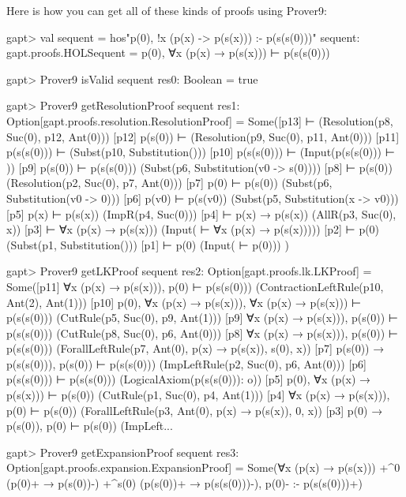 \documentclass[a4paper,11pt]{book}
\begin{document}
Here is how you can get all of these kinds of proofs using Prover9:
\begin{clilisting}
gapt> val sequent = hos"p(0), !x (p(x) -> p(s(x))) :- p(s(s(0)))"
sequent: gapt.proofs.HOLSequent = p(0), ∀x (p(x) → p(s(x))) ⊢ p(s(s(0)))

\end{clilisting}

\begin{clilisting}
gapt> Prover9 isValid sequent
res0: Boolean = true

gapt> Prover9 getResolutionProof sequent
res1: Option[gapt.proofs.resolution.ResolutionProof] =
Some([p13]  ⊢    (Resolution(p8, Suc(0), p12, Ant(0)))
[p12] p(s(0)) ⊢    (Resolution(p9, Suc(0), p11, Ant(0)))
[p11] p(s(s(0))) ⊢    (Subst(p10, Substitution()))
[p10] p(s(s(0))) ⊢    (Input(p(s(s(0))) ⊢ ))
[p9] p(s(0)) ⊢ p(s(s(0)))   (Subst(p6, Substitution(v0 -> s(0))))
[p8]  ⊢ p(s(0))   (Resolution(p2, Suc(0), p7, Ant(0)))
[p7] p(0) ⊢ p(s(0))   (Subst(p6, Substitution(v0 -> 0)))
[p6] p(v0) ⊢ p(s(v0))   (Subst(p5, Substitution(x -> v0)))
[p5] p(x) ⊢ p(s(x))   (ImpR(p4, Suc(0)))
[p4]  ⊢ p(x) → p(s(x))   (AllR(p3, Suc(0), x))
[p3]  ⊢ ∀x (p(x) → p(s(x)))   (Input( ⊢ ∀x (p(x) → p(s(x)))))
[p2]  ⊢ p(0)   (Subst(p1, Substitution()))
[p1]  ⊢ p(0)   (Input( ⊢ p(0)))
)

gapt> Prover9 getLKProof sequent
res2: Option[gapt.proofs.lk.LKProof] =
Some([p11] ∀x (p(x) → p(s(x))), p(0) ⊢ p(s(s(0)))    (ContractionLeftRule(p10, Ant(2), Ant(1)))
[p10] p(0), ∀x (p(x) → p(s(x))), ∀x (p(x) → p(s(x))) ⊢ p(s(s(0)))    (CutRule(p5, Suc(0), p9, Ant(1)))
[p9] ∀x (p(x) → p(s(x))), p(s(0)) ⊢ p(s(s(0)))    (CutRule(p8, Suc(0), p6, Ant(0)))
[p8] ∀x (p(x) → p(s(x))), p(s(0)) ⊢ p(s(s(0)))    (ForallLeftRule(p7, Ant(0), p(x) → p(s(x)), s(0), x))
[p7] p(s(0)) → p(s(s(0))), p(s(0)) ⊢ p(s(s(0)))    (ImpLeftRule(p2, Suc(0), p6, Ant(0)))
[p6] p(s(s(0))) ⊢ p(s(s(0)))    (LogicalAxiom(p(s(s(0))): o))
[p5] p(0), ∀x (p(x) → p(s(x))) ⊢ p(s(0))    (CutRule(p1, Suc(0), p4, Ant(1)))
[p4] ∀x (p(x) → p(s(x))), p(0) ⊢ p(s(0))    (ForallLeftRule(p3, Ant(0), p(x) → p(s(x)), 0, x))
[p3] p(0) → p(s(0)), p(0) ⊢ p(s(0))    (ImpLeft...

gapt> Prover9 getExpansionProof sequent
res3: Option[gapt.proofs.expansion.ExpansionProof] =
Some(∀x (p(x) → p(s(x))) +^{0} (p(0)+ → p(s(0))-) +^{s(0)} (p(s(0))+ → p(s(s(0)))-),
p(0)-
:-
p(s(s(0)))+)

\end{clilisting}
\end{document}
